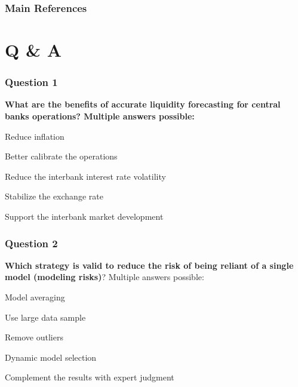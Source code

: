\documentclass{beamer}
\newenvironment{wideenumerate}{\enumerate\addtolength{\itemsep}{10pt}}{\endenumerate}
\begin{document}
\begin{frame}
  \frametitle{Main References}
\end{frame}

\section{Q \& A}

\begin{frame}
  \frametitle{Question 1}
  
  \textbf{What are the benefits of accurate liquidity forecasting for central banks operations? Multiple answers possible:}\\

  \bigskip

  \begin{wideenumerate}
    \item Reduce inflation
    \item Better calibrate the operations
    \item Reduce the interbank interest rate volatility 
    \item Stabilize the exchange rate
    \item Support the interbank market development
  \end{wideenumerate}
  
\end{frame}



\begin{frame}
  \frametitle{Question 2}
  \textbf{Which strategy is valid to reduce the risk of being reliant of a single model (modeling risks)}? Multiple answers possible:\\
  \bigskip

  \begin{wideenumerate}
  \item Model averaging
  \item Use large data sample 
  \item Remove outliers
  \item Dynamic model selection
  \item Complement the results with expert judgment
   
  \end{wideenumerate}
  
\end{frame}
\end{document}
